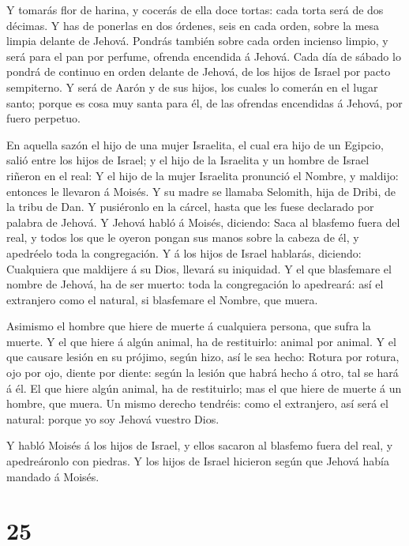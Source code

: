  Y tomarás flor de harina, y cocerás de ella doce tortas:
cada torta será de dos décimas.  Y has de ponerlas en dos
órdenes, seis en cada orden, sobre la mesa limpia delante de Jehová.
 Pondrás también sobre cada orden incienso limpio, y será
para el pan por perfume, ofrenda encendida á Jehová.  Cada
día de sábado lo pondrá de continuo en orden delante de Jehová, de los
hijos de Israel por pacto sempiterno.  Y será de Aarón y de
sus hijos, los cuales lo comerán en el lugar santo; porque es cosa muy
santa para él, de las ofrendas encendidas á Jehová, por fuero perpetuo.

 En aquella sazón el hijo de una mujer Israelita, el cual
era hijo de un Egipcio, salió entre los hijos de Israel; y el hijo de la
Israelita y un hombre de Israel riñeron en el real:  Y el
hijo de la mujer Israelita pronunció el Nombre, y maldijo: entonces le
llevaron á Moisés. Y su madre se llamaba Selomith, hija de Dribi, de la
tribu de Dan.  Y pusiéronlo en la cárcel, hasta que les
fuese declarado por palabra de Jehová.  Y Jehová habló á
Moisés, diciendo:  Saca al blasfemo fuera del real, y todos
los que le oyeron pongan sus manos sobre la cabeza de él, y apedréelo
toda la congregación.  Y á los hijos de Israel hablarás,
diciendo: Cualquiera que maldijere á su Dios, llevará su iniquidad.
 Y el que blasfemare el nombre de Jehová, ha de ser muerto:
toda la congregación lo apedreará: así el extranjero como el natural, si
blasfemare el Nombre, que muera.

 Asimismo el hombre que hiere de muerte á cualquiera
persona, que sufra la muerte.  Y el que hiere á algún
animal, ha de restituirlo: animal por animal.  Y el que
causare lesión en su prójimo, según hizo, así le sea hecho:
 Rotura por rotura, ojo por ojo, diente por diente: según
la lesión que habrá hecho á otro, tal se hará á él.  El que
hiere algún animal, ha de restituirlo; mas el que hiere de muerte á un
hombre, que muera.  Un mismo derecho tendréis: como el
extranjero, así será el natural: porque yo soy Jehová vuestro Dios.

 Y habló Moisés á los hijos de Israel, y ellos sacaron al
blasfemo fuera del real, y apedreáronlo con piedras. Y los hijos de
Israel hicieron según que Jehová había mandado á Moisés.

\hypertarget{section-24}{%
\section{25}\label{section-24}}

